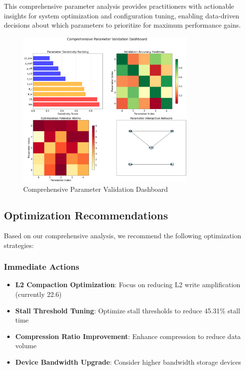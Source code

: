 \documentclass[11pt]{article}
\begin{document}
This comprehensive parameter analysis provides practitioners with actionable insights for system optimization and configuration tuning, enabling data-driven decisions about which parameters to prioritize for maximum performance gains.

\begin{figure}[H]
\centering
\includegraphics[width=0.8\textwidth]{experiments/2025-09-05/comprehensive_parameter_validation_dashboard.png}
\caption{Comprehensive Parameter Validation Dashboard}
\label{fig:parameter_dashboard}
\end{figure}

\subsection{Optimization Recommendations}

Based on our comprehensive analysis, we recommend the following optimization strategies:

\subsubsection{Immediate Actions}
\begin{itemize}
    \item \textbf{L2 Compaction Optimization}: Focus on reducing L2 write amplification (currently 22.6)
    \item \textbf{Stall Threshold Tuning}: Optimize stall thresholds to reduce 45.31\% stall time
    \item \textbf{Compression Ratio Improvement}: Enhance compression to reduce data volume
    \item \textbf{Device Bandwidth Upgrade}: Consider higher bandwidth storage devices
\end{itemize}
\end{document}
